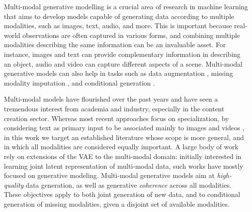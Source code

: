 
Multi-modal generative modelling is a crucial area of research in machine learning that aims to develop models capable of generating data according to multiple modalities, such as images, text, audio, and more. This is important because real-world observations are often captured in various forms, and combining multiple modalities describing the same information can be an invaluable asset. For instance, images and text can provide complementary information in describing an object, audio and video can capture different aspects of a scene. Multi-modal generative models can also help in tasks such as data augmentation \citep{he2023is, azizi2023synthetic, sariyildiz2023fake}, missing modality imputation \citep{pmlr-v97-antelmi19a, 9680207, zhang2023unified, Tran_2017_CVPR}, and conditional generation \citep{huang2022eccv, lee2018harmonizing}.

Multi-modal models have flourished over the past years and have seen a tremendous interest from academia and industry, especially in the content creation sector. Whereas most recent approaches focus on specialization, by considering text as primary input to be associated mainly to images \citep{Rombach_2022_CVPR, saharia2022photorealistic, ramesh2022hierarchical, tao2022dfgan, Wu_2022_CVPR, nichol2022glide, chang2023muse} and videos \citep{blattmann2023align, hong2023cogvideo, singer2022makeavideo}, in this work we target an established literature whose scope is more general, and in which all modalities are considered equally important. A large body of work rely on extensions of the \gls{VAE} \citep{kingmaW13vae} to the multi-modal domain: initially interested in learning joint latent representation of multi-modal data, such works have mostly focused on generative modeling.
Multi-modal generative models aim at \textit{high-quality} data generation, as well as generative \textit{coherence} across all modalities. These objectives apply to both joint generation of new data, and to conditional generation of missing modalities, given a disjoint set of available modalities.


